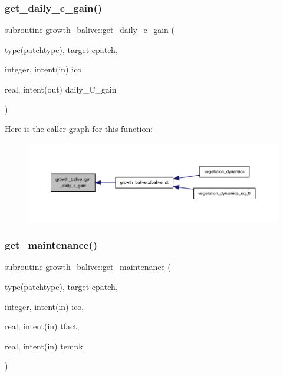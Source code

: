 \subsubsection{\texorpdfstring{get\+\_\+daily\+\_\+c\+\_\+gain()}{get\_daily\_c\_gain()}}
{\footnotesize\ttfamily subroutine growth\+\_\+balive\+::get\+\_\+daily\+\_\+c\+\_\+gain (\begin{DoxyParamCaption}\item[{type(patchtype), target}]{cpatch,  }\item[{integer, intent(in)}]{ico,  }\item[{real, intent(out)}]{daily\+\_\+\+C\+\_\+gain }\end{DoxyParamCaption})}

Here is the caller graph for this function\+:
\nopagebreak
\begin{figure}[H]
\begin{center}
\leavevmode
\includegraphics[width=350pt]{namespacegrowth__balive_ad43c7e3fcb88db17077ed58aeab8fe2d_icgraph}
\end{center}
\end{figure}
\mbox{\label{namespacegrowth__balive_ac2f667372e6f2a5fc7329466cc958a6c}} 
\subsubsection{\texorpdfstring{get\+\_\+maintenance()}{get\_maintenance()}}
{\footnotesize\ttfamily subroutine growth\+\_\+balive\+::get\+\_\+maintenance (\begin{DoxyParamCaption}\item[{type(patchtype), target}]{cpatch,  }\item[{integer, intent(in)}]{ico,  }\item[{real, intent(in)}]{tfact,  }\item[{real, intent(in)}]{tempk }\end{DoxyParamCaption})}

